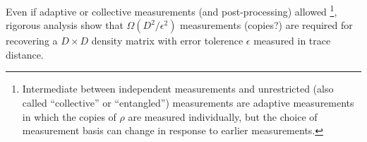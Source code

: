 \documentclass[
aps,
pra,
twocolumn,
floatfix,
]{revtex4-2}
\theoremstyle{plain}
\theoremstyle{definition}
\newcommand{\ob}{O}
\newcommand{\dm}{\rho}
\newcommand{\bmsigma}{\bm{\sigma}}
\begin{document}
Even if adaptive or collective measurements (and post-processing) allowed 
\footnote{Intermediate between independent measurements and unrestricted (also called “collective” or “entangled”) measurements are adaptive measurements in which the copies of $\dm$ are measured individually, but the choice of measurement basis can change in response to earlier measurements.},
rigorous analysis \cite{haahSampleoptimalTomographyQuantum2017} \cite{odonnellEfficientQuantumTomography2016} show that 
$\Omega(D^2/\epsilon^2)$ measurements (copies?)  are required for recovering a $D\times D$ density matrix
with error tolerence $\epsilon$ measured in trace distance.
\end{document}
